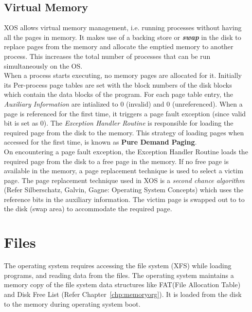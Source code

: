 \documentclass[10pt]{report}
\begin{document}
 
\section{Virtual Memory}
\label{sec:virtualmem}

XOS allows virtual memory management, i.e. running processes without having all the pages in memory. It makes use of a backing store or \textbf{\textit{swap}} in the disk to replace pages from the memory and allocate the emptied memory to another process. This increases the total number of processes that can be run simultaneously on the OS.\\

When a process starts executing, no memory pages are allocated for it. Initially its Per-process page tables are set with the block numbers of the disk blocks which contain the data blocks of the program. For each page table entry, the \textit{Auxiliary Information} are intialized to 0 (invalid) and 0 (unreferenced). When a page is referenced for the first time, it triggers a page fault exception (since valid bit is set as 0). The \textit{Exception Handler Routine} is responsible for loading the required page from the disk to the memory. This strategy of loading pages when accessed for the first time, is known as \textbf{Pure Demand Paging}.\\

On encountering a page fault exception, the Exception Handler Routine loads the required page from the disk to a free page in the memory. If no free page is available in the memory, a page replacement technique is used to select a victim page. The page replacement technique used in XOS is a \textit{second chance algorithm} (Refer Silberschatz, Galvin, Gagne: Operating System Concepts) which uses the reference bits in the auxiliary information. The victim page is swapped out to to the disk (swap area) to accommodate the required page.




 \chapter{Files}
\label{chp:files}
The operating system requires accessing the file system (XFS) while loading programs, and reading data from the files. The operating system maintains a memory copy of the file system data structures like FAT(File Allocation Table) and Disk Free List (Refer Chapter~\ref{chp:memoryorg}). It is loaded from the disk to the memory during operating system boot.\\
\end{document}
